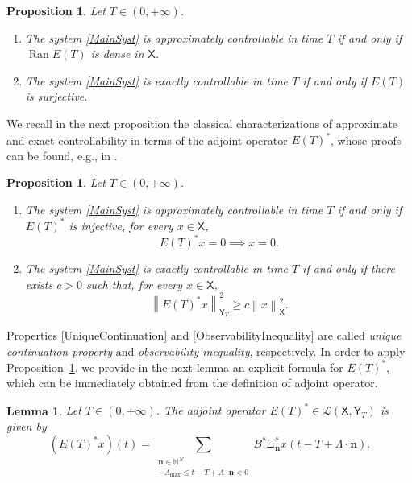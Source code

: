 \documentclass[JEP,XML,SOM,Unicode]{cedram}
\renewcommand{\eg}{e.g.,\xspace}
\newcommand{\bn}{\boldsymbol{n}}
\theoremstyle{plain}
\newtheorem{lemm}[theo]{Lemma}
\newtheorem{prop}[theo]{Proposition}
\theoremstyle{definition}
\DeclareMathOperator{\range}{Ran}
\newcommand{\norm}[1]{\left\lVert #1\right\lVert}
\begin{document}
\begin{prop}
\label{PropETControl}
Let $T \in (0, +\infty)$.
\begin{enumerate}
\item\label{PropETControlApprox} The system \eqref{MainSyst} is approximately controllable in time $T$ if and only if $\range E(T)$ is dense in $\mathsf X$.
\item\label{PropETControlExact} The system \eqref{MainSyst} is exactly controllable in time $T$ if and only if $E(T)$ is surjective.
\end{enumerate}
\end{prop}

We recall in the next proposition the classical characterizations of approximate and exact controllability in terms of the adjoint operator $E(T)^\ast$, whose proofs can be found, \eg in \cite[\S 2.3.2]{Coron2007Control}.

\begin{prop}
\label{PropControl}
Let $T \in (0, +\infty)$.
\begin{enumerate}
\item The system \eqref{MainSyst} is approximately controllable in time $T$ if and only if $E(T)^\ast$ is injective, \ie for every $x \in \mathsf X$,
\begin{equation}
\label{UniqueContinuation}
E(T)^\ast x = 0 \implies x = 0.
\end{equation}

\item\label{ControlExactETAst} The system \eqref{MainSyst} is exactly controllable in time $T$ if and only if there exists $c > 0$ such that, for every $x \in \mathsf X$,
\begin{equation}
\label{ObservabilityInequality}
\norm{E(T)^\ast x}_{\mathsf Y_T}^2 \geq c \norm{x}_{\mathsf X}^2.
\end{equation}
\end{enumerate}
\end{prop}

Properties \eqref{UniqueContinuation} and \eqref{ObservabilityInequality} are called \emph{unique continuation property} and \emph{observability inequality}, respectively. In order to apply Proposition~\ref{PropControl}, we provide in the next lemma an explicit formula for $E(T)^\ast$, which can be immediately obtained from the definition of adjoint operator.

\begin{lemm}
\label{LemmETAdj}
Let $T \in (0, +\infty)$. The adjoint operator $E(T)^\ast \in \mathcal L(\mathsf X, \mathsf Y_T)$ is given by
\begin{equation}
\label{EqETAst}
(E(T)^\ast x)(t) = \sum_{\substack{\bn \in \mathbb N^N \\ -\Lambda_{\max} \leq t - T + \Lambda \cdot \bn < 0}} B^\ast \Xi_{\bn}^\ast x(t - T + \Lambda \cdot \bn).
\end{equation}
\end{lemm}
\end{document}
